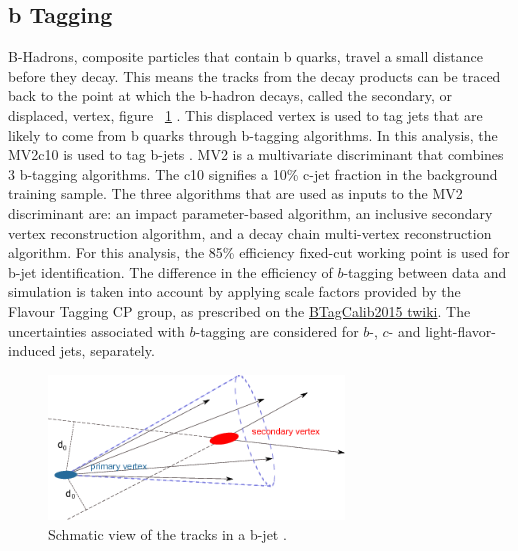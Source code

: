 \subsection{b Tagging}\label{ssec:btag}
B-Hadrons, composite particles that contain b quarks, travel a small distance before they decay. This means the tracks from the decay products can be traced back to the point at which the b-hadron decays, called the secondary, or displaced, vertex, figure ~\ref{fig:bjets} . This displaced vertex is used to tag jets that are likely to come from b quarks through b-tagging algorithms.\newline
\indent In this analysis, the MV2c10 is used to tag b-jets \cite{ATL-PHYS-PUB-2016-012}. MV2 is a multivariate discriminant that combines 3 b-tagging algorithms. The c10 signifies a 10\% c-jet fraction in the background training sample. The three algorithms that are used as inputs to the MV2 discriminant are: an impact parameter-based algorithm, an inclusive secondary vertex reconstruction algorithm, and a decay chain multi-vertex reconstruction algorithm. For this analysis, the 85\% efficiency fixed-cut working point is used for b-jet identification.\newline
\indent The difference in the efficiency of $b$-tagging between data and simulation 
is taken into account by applying scale factors provided by the Flavour Tagging CP group, 
as prescribed on the \href{https://twiki.cern.ch/twiki/bin/view/AtlasProtected/BTagCalib2015}{BTagCalib2015 twiki}. 
The uncertainties associated with $b$-tagging are considered for $b$-, $c$- and light-flavor-induced jets, separately. 

\begin{figure}[h]
\begin{center}
\includegraphics*[width=0.70\textwidth] {figures/bjet}
\caption[Schmatic view of the tracks in a b-jet]{Schmatic view of the tracks in a b-jet \cite{HanssonAdrian:1397942}.}
\label{fig:bjets}
\end{center}
\end{figure}

